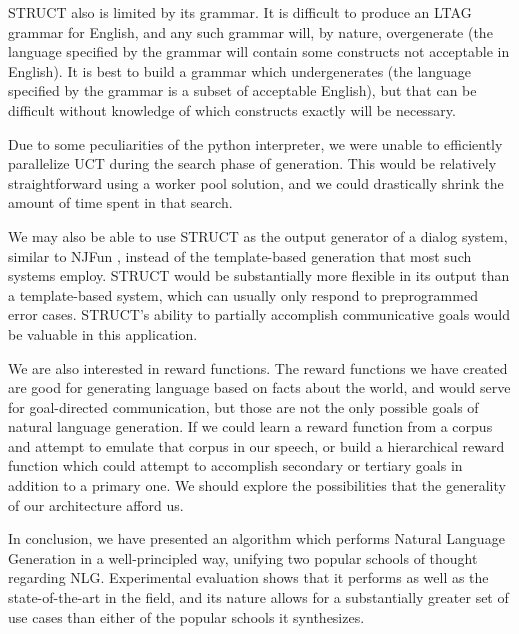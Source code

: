 STRUCT also is limited by its grammar.  It is difficult to produce an LTAG grammar
for English, and any such grammar will, by nature, overgenerate (the language
specified by the grammar will contain some constructs not acceptable in
English).  It is best to build a grammar which undergenerates (the language
specified by the grammar is a subset of acceptable English), but that can
be difficult without knowledge of which constructs exactly will be necessary.

Due to some peculiarities of the python interpreter, we were unable to
efficiently parallelize UCT during the search phase of generation.  This
would be relatively straightforward using a worker pool solution, and we
could drastically shrink the amount of time spent in that search.

We may also be able to use STRUCT as the output generator of a dialog system,
similar to NJFun \cite{litman_njfun_2000}, instead of the template-based generation
that most such systems employ.  STRUCT would be substantially more flexible in
its output than a template-based system, which can usually only respond to preprogrammed
error cases.  STRUCT's ability to partially accomplish communicative goals would be
valuable in this application.

We are also interested in reward functions.  The reward functions we have created
are good for generating language based on facts about the world, and would
serve for goal-directed communication, but those are not the only possible
goals of natural language generation.  If we could learn a reward function from
a corpus and attempt to emulate that corpus in our speech, or build a hierarchical
reward function which could attempt to accomplish secondary or tertiary goals
in addition to a primary one.  We should explore the possibilities that the
generality of our architecture afford us.

In conclusion, we have presented an algorithm which performs Natural Language
Generation in a well-principled way, unifying two popular schools of thought regarding
NLG.  Experimental evaluation shows that it performs as well as the state-of-the-art in
the field, and its nature allows for a substantially greater set of use cases than either
of the popular schools it synthesizes.